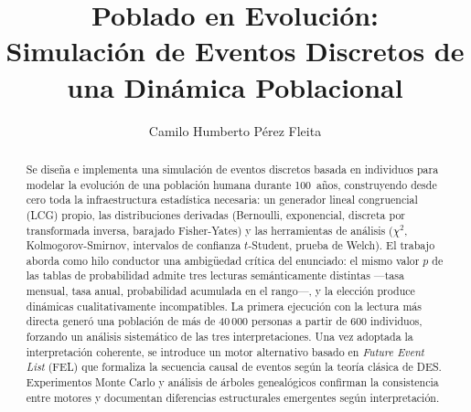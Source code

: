 \documentclass{llncs}
\begin{document}
\title{Poblado en Evolución:\\
Simulación de Eventos Discretos de una Dinámica Poblacional}


\author{Camilo Humberto Pérez Fleita}



\maketitle

\begin{abstract}
Se diseña e implementa una simulación de eventos discretos basada en
individuos para modelar la evolución de una población humana durante
100~años, construyendo desde cero toda la infraestructura estadística
necesaria: un generador lineal congruencial (LCG) propio, las
distribuciones derivadas (Bernoulli, exponencial, discreta por
transformada inversa, barajado Fisher-Yates) y las herramientas de
análisis ($\chi^2$, Kolmogorov-Smirnov, intervalos de confianza
$t$-Student, prueba de Welch).
El trabajo aborda como hilo conductor una ambigüedad crítica del
enunciado: el mismo valor $p$ de las tablas de probabilidad admite
tres lecturas semánticamente distintas ---tasa mensual, tasa anual,
probabilidad acumulada en el rango---, y la elección produce dinámicas
cualitativamente incompatibles.
La primera ejecución con la lectura más directa generó una población
de más de 40\,000 personas a partir de 600 individuos, forzando un
análisis sistemático de las tres interpretaciones.
Una vez adoptada la interpretación coherente, se introduce un motor
alternativo basado en \emph{Future Event List} (FEL) que formaliza
la secuencia causal de eventos según la teoría clásica de DES\@.
Experimentos Monte Carlo y análisis de árboles genealógicos confirman
la consistencia entre motores y documentan diferencias estructurales
emergentes según interpretación.
\end{abstract}
\end{document}
